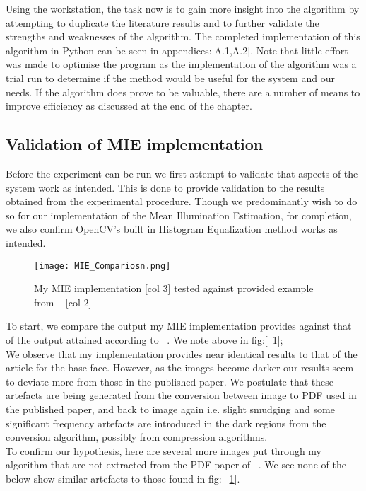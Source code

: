 	Using the workstation, the task now is to gain more insight into the algorithm by attempting to duplicate the literature results 
	and to further validate the strengths and weaknesses of the algorithm.  The completed implementation of this algorithm in Python 
	can be seen in appendices:[A.1,A.2].  Note that little effort was made to optimise the program as the 
	implementation of the algorithm was a trial run to determine if the method would be useful for the system and our needs.  If the 
	algorithm does prove to be valuable, there are a number of means to improve efficiency as discussed at the end of the chapter.

\subsection{Validation of MIE implementation}
	Before the experiment can be run we first attempt to validate that aspects of the system work as intended.  
	This is done to provide validation to the results obtained from the experimental procedure.  Though we 
	predominantly wish to do so for our implementation of the Mean Illumination Estimation, for completion, we  
	also confirm OpenCV's built in Histogram Equalization method works as intended.

		\begin{figure}[H]
			\centering
			\caption{My MIE implementation [col 3] tested against provided example from ~\cite{LuoaRINMBoMEfFR} [col 2] \label{fig:MIE_Compariosn}}
			\texttt{[image: MIE\_Compariosn.png]}
		\end{figure}

	To start, we compare the output my MIE implementation provides against that of the output attained according 
	to ~\cite{LuoaRINMBoMEfFR}.  We note above in fig:[~\ref{fig:MIE_Compariosn}]; \\
	 
	We observe that my implementation provides near identical results to that of the article for the base face.  However, 
	as the images become darker our results seem to deviate more from those in the published paper.  We postulate that 
	these artefacts are being generated from the conversion between image to PDF used in the published paper, and back 
	to image again i.e. slight smudging and some significant frequency artefacts are introduced in the dark regions 
	from the conversion algorithm, possibly from compression algorithms. \\

	To confirm our hypothesis, here are several more images put through my algorithm that are not extracted from the PDF
	paper of ~\cite{LuoaRINMBoMEfFR}.  We see none of the below show similar artefacts to those found in 
	fig:[~\ref{fig:MIE_Compariosn}].


